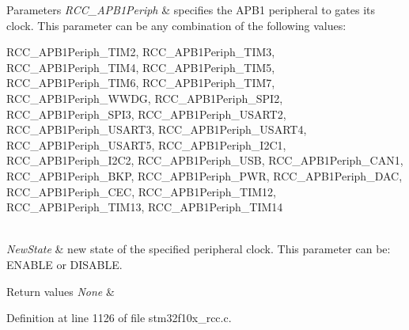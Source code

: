 \begin{DoxyParams}{Parameters}
{\em R\+C\+C\+\_\+\+A\+P\+B1\+Periph} & specifies the A\+P\+B1 peripheral to gates its clock. This parameter can be any combination of the following values\+: \begin{DoxyItemize}
\item R\+C\+C\+\_\+\+A\+P\+B1\+Periph\+\_\+\+T\+I\+M2, R\+C\+C\+\_\+\+A\+P\+B1\+Periph\+\_\+\+T\+I\+M3, R\+C\+C\+\_\+\+A\+P\+B1\+Periph\+\_\+\+T\+I\+M4, R\+C\+C\+\_\+\+A\+P\+B1\+Periph\+\_\+\+T\+I\+M5, R\+C\+C\+\_\+\+A\+P\+B1\+Periph\+\_\+\+T\+I\+M6, R\+C\+C\+\_\+\+A\+P\+B1\+Periph\+\_\+\+T\+I\+M7, R\+C\+C\+\_\+\+A\+P\+B1\+Periph\+\_\+\+W\+W\+DG, R\+C\+C\+\_\+\+A\+P\+B1\+Periph\+\_\+\+S\+P\+I2, R\+C\+C\+\_\+\+A\+P\+B1\+Periph\+\_\+\+S\+P\+I3, R\+C\+C\+\_\+\+A\+P\+B1\+Periph\+\_\+\+U\+S\+A\+R\+T2, R\+C\+C\+\_\+\+A\+P\+B1\+Periph\+\_\+\+U\+S\+A\+R\+T3, R\+C\+C\+\_\+\+A\+P\+B1\+Periph\+\_\+\+U\+S\+A\+R\+T4, R\+C\+C\+\_\+\+A\+P\+B1\+Periph\+\_\+\+U\+S\+A\+R\+T5, R\+C\+C\+\_\+\+A\+P\+B1\+Periph\+\_\+\+I2\+C1, R\+C\+C\+\_\+\+A\+P\+B1\+Periph\+\_\+\+I2\+C2, R\+C\+C\+\_\+\+A\+P\+B1\+Periph\+\_\+\+U\+SB, R\+C\+C\+\_\+\+A\+P\+B1\+Periph\+\_\+\+C\+A\+N1, R\+C\+C\+\_\+\+A\+P\+B1\+Periph\+\_\+\+B\+KP, R\+C\+C\+\_\+\+A\+P\+B1\+Periph\+\_\+\+P\+WR, R\+C\+C\+\_\+\+A\+P\+B1\+Periph\+\_\+\+D\+AC, R\+C\+C\+\_\+\+A\+P\+B1\+Periph\+\_\+\+C\+EC, R\+C\+C\+\_\+\+A\+P\+B1\+Periph\+\_\+\+T\+I\+M12, R\+C\+C\+\_\+\+A\+P\+B1\+Periph\+\_\+\+T\+I\+M13, R\+C\+C\+\_\+\+A\+P\+B1\+Periph\+\_\+\+T\+I\+M14 \end{DoxyItemize}
\\
\hline
{\em New\+State} & new state of the specified peripheral clock. This parameter can be\+: E\+N\+A\+B\+LE or D\+I\+S\+A\+B\+LE. \\
\hline
\end{DoxyParams}

\begin{DoxyRetVals}{Return values}
{\em None} & \\
\hline
\end{DoxyRetVals}


Definition at line 1126 of file stm32f10x\+\_\+rcc.\+c.

\mbox{\label{group___r_c_c___exported___functions_gab197ae4369c10b92640a733b40ed2801}} 
